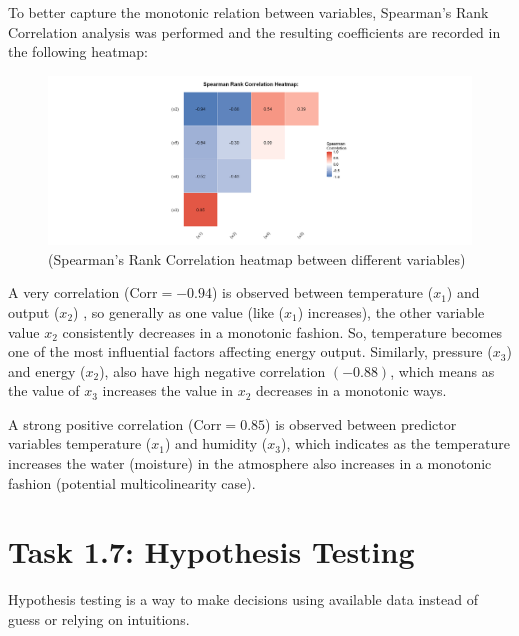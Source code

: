 \documentclass[12pt,a4paper]{article}
\begin{document}
To better capture the monotonic relation between variables, Spearman's 
Rank Correlation analysis was performed and the resulting coefficients are 
recorded in the following heatmap: 

\begin{figure}[H]
  \centering
  \includegraphics[width=\textwidth]{z12.png}
  \caption{(Spearman's Rank Correlation heatmap between different variables)}
  \label{fig:Spearman Correlation Matrix}
\end{figure}

A very correlation ($\text{Corr} = -0.94$) is observed between temperature ($x_1$) and output ($x_2$)
, so generally as one value (like ($x_1$) increases), the other variable value $x_2$ consistently 
decreases in a monotonic fashion. So, temperature becomes one of the 
most influential factors affecting energy output. Similarly, pressure ($x_3$) and energy ($x_2$), also have high negative 
correlation $(-0.88)$, which means as the value of $x_3$ increases the value in $x_2$
decreases in a monotonic ways. 

A strong positive correlation ($\text{Corr} = 0.85$) is 
observed between predictor variables temperature ($x_1$) and humidity ($x_3$), 
which indicates as the temperature increases the water (moisture) in the atmosphere also increases
in a monotonic fashion (potential multicolinearity case).


\section*{Task 1.7: Hypothesis Testing}

Hypothesis testing is a way to make decisions using available data instead of guess or relying on 
intuitions. %
\end{document}
